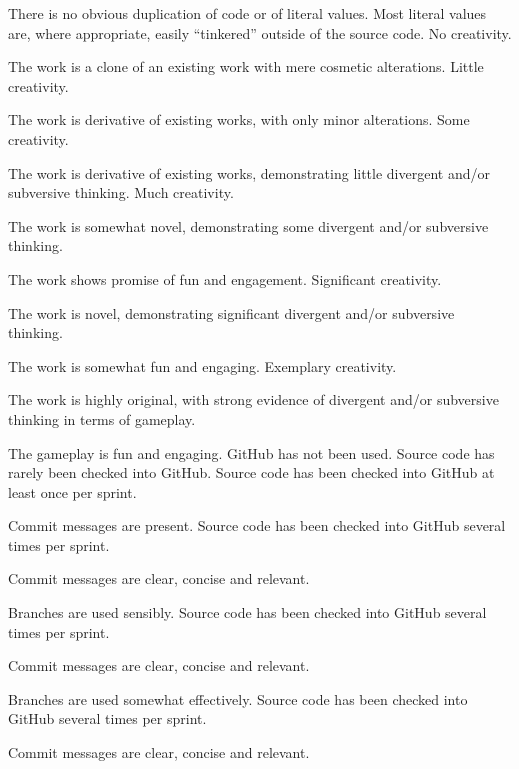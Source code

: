 \documentclass{../fal_assignment}
\begin{document}
\begin{markingrubric}
             \par There is no obvious duplication of code or of literal values. Most literal values are, where appropriate, easily ``tinkered'' outside of the source code.  
%
        \grade\fail No creativity.
            \par The work is a clone of an existing work with mere cosmetic alterations.
        \grade Little creativity.
            \par The work is derivative of existing works, with only minor alterations.
        \grade Some creativity.
            \par The work is derivative of existing works, demonstrating little divergent and/or subversive thinking.
        \grade Much creativity.
            \par The work is somewhat novel, demonstrating some divergent and/or subversive thinking.
            \par The work shows promise of fun and engagement.
        \grade Significant creativity.
            \par The work is novel, demonstrating significant divergent and/or subversive thinking.
            \par The work is somewhat fun and engaging.
        \grade Exemplary creativity.
            \par The work is highly original, with strong evidence of divergent and/or subversive thinking in terms of gameplay.
            \par The gameplay is fun and engaging.
%
        \grade\fail GitHub has not been used.
        \grade Source code has rarely been checked into GitHub.
        \grade Source code  has been checked into GitHub at least once per sprint.
            \par Commit messages are present.
        \grade Source code  has been checked into GitHub several times per sprint.
            \par Commit messages are clear, concise and relevant.
            \par Branches are used sensibly.
        \grade Source code has been checked into GitHub several times per sprint.
            \par Commit messages are clear, concise and relevant.
            \par Branches are used somewhat effectively.
        \grade Source code has been checked into GitHub several times per sprint.
            \par Commit messages are clear, concise and relevant.

\end{markingrubric}
\end{document}
